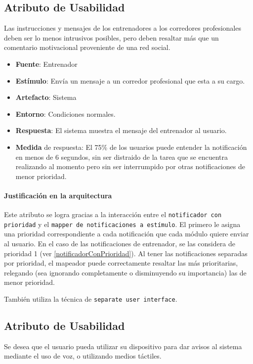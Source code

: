 \subsection{Atributo de Usabilidad}
Las instrucciones y mensajes de los entrenadores a los corredores profesionales deben ser lo menos intrusivos posibles, pero deben resaltar más que un comentario motivacional proveniente de una red social.

\begin{itemize}
  \item \textbf{Fuente}: Entrenador
  \item \textbf{Estímulo}: Envía un mensaje a un corredor profesional que esta a su cargo.
  \item \textbf{Artefacto}: Sistema
  \item \textbf{Entorno}: Condiciones normales.
  \item \textbf{Respuesta}: El sistema muestra el mensaje del entrenador al usuario.
  \item \textbf{Medida} de respuesta: El 75\% de los usuarios puede entender la notificación en menos de 6 segundos, sin ser distraido de la tarea que se encuentra realizando al momento pero sin ser interrumpido por otras notificaciones de menor prioridad.
\end{itemize}

\paragraph{Justificación en la arquitectura}
Este atributo se logra gracias a la interacción entre el \texttt{notificador con prioridad} y el \texttt{mapper de notificaciones a estímulo}. El primero le asigna una prioridad correspondiente a cada notificación que cada módulo quiere enviar al usuario. En el caso de las notificaciones de entrenador, se las considera de prioridad 1 (ver \ref{notificadorConPrioridad}). Al tener las notificaciones separadas por prioridad, el mapeador puede correctamente resaltar las más prioritarias, relegando (sea ignorando completamente o disminuyendo su importancia) las de menor prioridad.

También utiliza la técnica de \texttt{separate user interface}.


\subsection{Atributo de Usabilidad}
Se desea que el usuario pueda utilizar su dispositivo para dar avisos al sistema mediante el uso de voz, o utilizando medios táctiles.

